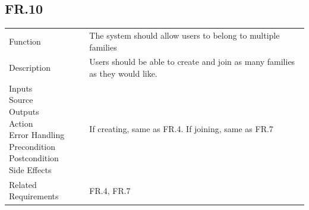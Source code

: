 \documentclass[12pt]{article}
\begin{document}
    \subsection*{FR.10}
    \begin{center}
        \begin{tabular}{| p{10em} p{26em} |}
        \hline
         Function & The system should allow users to belong to multiple families\\
         Description & Users should be able to create and join as many families as they would like.\\
        \makecell{Inputs \\ Source \\ Outputs \\ Action \\ Error Handling \\ Precondition \\ Postcondition \\ Side Effects}
         & If creating, same as FR.4. If joining, same as FR.7\\
         Related Requirements & FR.4, FR.7\\
         \hline
        \end{tabular}
    \end{center}
\end{document}
